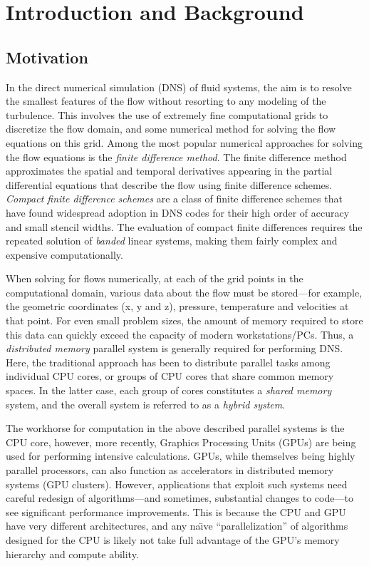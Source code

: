 \chapter{Introduction and Background}

\section{Motivation}

In the direct numerical simulation (DNS) of fluid systems,
the aim is to resolve the smallest features of the flow
without resorting to any modeling of the turbulence.
This involves the use of
extremely fine computational grids to
discretize the flow domain,
and some numerical method for solving the
flow equations on this grid.
Among the most popular numerical approaches for
solving the flow equations
is the \emph{finite difference method}.
The finite difference method approximates the
spatial and temporal derivatives appearing in the
partial differential equations that describe the flow
using finite difference schemes.
\emph{Compact finite difference schemes} are a class
of finite difference schemes that have found widespread
adoption in DNS codes
for their high order of accuracy and small stencil widths.
The evaluation of compact finite differences
requires the repeated solution of \emph{banded} linear systems,
making them fairly complex and expensive computationally.

When solving for flows numerically,
at each of the grid points in the computational domain,
various data about the flow must be stored---for
example, the geometric coordinates (x, y and z),
pressure, temperature and velocities at that point.
For even small problem sizes,
the amount of memory required to store this data
can quickly exceed the capacity of modern workstations/PCs.
Thus, a \emph{distributed memory} parallel system
is generally required for performing DNS.
Here, the traditional approach has been
to distribute parallel tasks among individual CPU cores,
or groups of CPU cores
that share common memory spaces.
In the latter case,
each group of cores constitutes a \emph{shared memory} system,
and the overall system is referred to as a \emph{hybrid system}.

The workhorse for computation in the above described
parallel systems is the CPU core,
however, more recently,
Graphics Processing Units (GPUs)
are being used for performing intensive calculations.
GPUs, while themselves being highly parallel processors,
can also function as accelerators in distributed memory systems
(GPU clusters).
However,
applications that exploit such systems
need careful redesign of algorithms---and
sometimes, substantial changes to code---to
see significant performance improvements.
This is because the CPU and GPU have very different architectures,
and any na\"{\i}ve ``parallelization'' of algorithms
designed for the CPU
is likely not take full advantage of the GPU's
memory hierarchy and compute ability.

